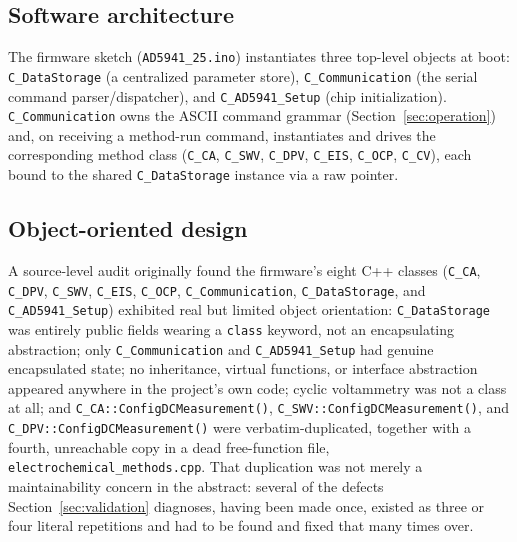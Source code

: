 \subsection{Software architecture}
\label{sec:swarch}
The firmware sketch (\texttt{AD5941\_25.ino}) instantiates three top-level
objects at boot: \texttt{C\_DataStorage} (a centralized parameter store),
\texttt{C\_Communication} (the serial command parser/dispatcher), and
\texttt{C\_AD5941\_Setup} (chip initialization). \texttt{C\_Communication}
owns the ASCII command grammar (Section~\ref{sec:operation}) and, on
receiving a method-run command, instantiates and drives the corresponding
method class (\texttt{C\_CA}, \texttt{C\_SWV}, \texttt{C\_DPV},
\texttt{C\_EIS}, \texttt{C\_OCP}, \texttt{C\_CV}), each bound to the shared
\texttt{C\_DataStorage} instance via a raw pointer.

\subsection{Object-oriented design}
\label{sec:oop}
A source-level audit originally found the firmware's eight C++ classes
(\texttt{C\_CA}, \texttt{C\_DPV}, \texttt{C\_SWV}, \texttt{C\_EIS},
\texttt{C\_OCP}, \texttt{C\_Communication}, \texttt{C\_DataStorage}, and
\texttt{C\_AD5941\_Setup}) exhibited real but limited object orientation:
\texttt{C\_DataStorage} was entirely public fields wearing a
\texttt{class} keyword, not an encapsulating abstraction; only
\texttt{C\_Communication} and \texttt{C\_AD5941\_Setup} had genuine
encapsulated state; no inheritance, virtual functions, or interface
abstraction appeared anywhere in the project's own code; cyclic voltammetry
was not a class at all; and \texttt{C\_CA::ConfigDCMeasurement()},
\texttt{C\_SWV::ConfigDCMeasurement()}, and \texttt{C\_DPV::ConfigDCMeasurement()}
were verbatim-duplicated, together with a fourth, unreachable copy in a
dead free-function file, \texttt{electrochemical\_methods.cpp}. That
duplication was not merely a maintainability concern in the abstract:
several of the defects Section~\ref{sec:validation} diagnoses, having
been made once, existed as three or four literal repetitions and had to be
found and fixed that many times over.

